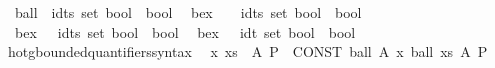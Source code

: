 \begin{isabellebody}
\ \ {\isachardoublequoteopen}{\isacharunderscore}{\kern0pt}ball{}{\isachardoublequoteclose}\ {\isacharcolon}{\kern0pt}{\isacharcolon}{\kern0pt}\ {\isacartoucheopen}{\isacharbrackleft}{\kern0pt}idts{\isacharcomma}{\kern0pt}\ set{\isacharcomma}{\kern0pt}\ bool{\isacharbrackright}{\kern0pt}\ {\isasymRightarrow}\ bool{\isacartoucheclose}\isanewline
\ \ {\isachardoublequoteopen}{\isacharunderscore}{\kern0pt}bex{\isachardoublequoteclose}\ \ \ {\isacharcolon}{\kern0pt}{\isacharcolon}{\kern0pt}\ {\isacartoucheopen}{\isacharbrackleft}{\kern0pt}idts{\isacharcomma}{\kern0pt}\ set{\isacharcomma}{\kern0pt}\ bool{\isacharbrackright}{\kern0pt}\ {\isasymRightarrow}\ bool{\isacartoucheclose}\ {\isacharparenleft}{\kern0pt}{\isachardoublequoteopen}{\isacharparenleft}{\kern0pt}{}{\isasymexists}{\isacharunderscore}{\kern0pt}\ {\isasymin}\ {\isacharunderscore}{\kern0pt}{\isachardot}{\kern0pt}{\isacharslash}{\kern0pt}\ {\isacharunderscore}{\kern0pt}{\isacharparenright}{\kern0pt}{\isachardoublequoteclose}\ {}{}{\isacharparenright}{\kern0pt}\isanewline
\ \ {\isachardoublequoteopen}{\isacharunderscore}{\kern0pt}bex{}{\isachardoublequoteclose}\ \ {\isacharcolon}{\kern0pt}{\isacharcolon}{\kern0pt}\ {\isacartoucheopen}{\isacharbrackleft}{\kern0pt}idts{\isacharcomma}{\kern0pt}\ set{\isacharcomma}{\kern0pt}\ bool{\isacharbrackright}{\kern0pt}\ {\isasymRightarrow}\ bool{\isacartoucheclose}\isanewline
\ \ {\isachardoublequoteopen}{\isacharunderscore}{\kern0pt}bex{}{\isachardoublequoteclose}\ \ {\isacharcolon}{\kern0pt}{\isacharcolon}{\kern0pt}\ {\isacartoucheopen}{\isacharbrackleft}{\kern0pt}idt{\isacharcomma}{\kern0pt}\ set{\isacharcomma}{\kern0pt}\ bool{\isacharbrackright}{\kern0pt}\ {\isasymRightarrow}\ bool{\isacartoucheclose}\ {\isacharparenleft}{\kern0pt}{\isachardoublequoteopen}{\isacharparenleft}{\kern0pt}{}{\isasymexists}{\isacharbang}{\kern0pt}{\isacharunderscore}{\kern0pt}\ {\isasymin}\ {\isacharunderscore}{\kern0pt}{\isachardot}{\kern0pt}{\isacharslash}{\kern0pt}\ {\isacharunderscore}{\kern0pt}{\isacharparenright}{\kern0pt}{\isachardoublequoteclose}\ {}{}{\isacharparenright}{\kern0pt}\isanewline
{}\isamarkupfalse%
\isanewline
{}\isamarkupfalse%
\ hotg{\isacharunderscore}{\kern0pt}bounded{\isacharunderscore}{\kern0pt}quantifiers{\isacharunderscore}{\kern0pt}syntax\isanewline
{}\isamarkupfalse%
\isanewline
\ \ {\isachardoublequoteopen}{\isasymforall}x\ xs\ {\isasymin}\ A{\isachardot}{\kern0pt}\ P{\isachardoublequoteclose}\ {\isasymrightharpoonup}\ {\isachardoublequoteopen}CONST\ ball\ A\ {\isacharparenleft}{\kern0pt}{\isasymlambda}x{\isachardot}{\kern0pt}\ {\isacharunderscore}{\kern0pt}ball{}\ xs\ A\ P{\isacharparenright}{\kern0pt}{\isachardoublequoteclose}\isanewline

\end{isabellebody}
